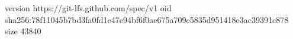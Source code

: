 version https://git-lfs.github.com/spec/v1
oid sha256:78f11045b7bd3fa0fd1e47e94bf6f0ae675a709e5835d951418e3ac39391c878
size 43840
